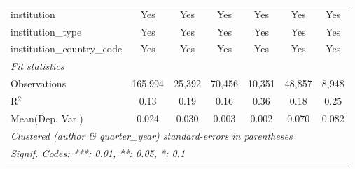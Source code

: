 \begin{tabular}{lcccccc}
   institution                  & Yes           & Yes           & Yes          & Yes      & Yes           & Yes\\  
   institution\_type            & Yes           & Yes           & Yes          & Yes      & Yes           & Yes\\  
   institution\_country\_code   & Yes           & Yes           & Yes          & Yes      & Yes           & Yes\\  
   \midrule
   \emph{Fit statistics}\\
   Observations                 & 165,994       & 25,392        & 70,456       & 10,351   & 48,857        & 8,948\\  
   R$^2$                        & 0.13          & 0.19          & 0.16         & 0.36     & 0.18          & 0.25\\  
Mean(Dep. Var.) & 0.024 & 0.030 & 0.003 & 0.002 & 0.070 & 0.082 \\
   \midrule \midrule
   \multicolumn{7}{l}{\emph{Clustered (author \& quarter\_year) standard-errors in parentheses}}\\
   \multicolumn{7}{l}{\emph{Signif. Codes: ***: 0.01, **: 0.05, *: 0.1}}\\
\end{tabular}
\par\endgroup
